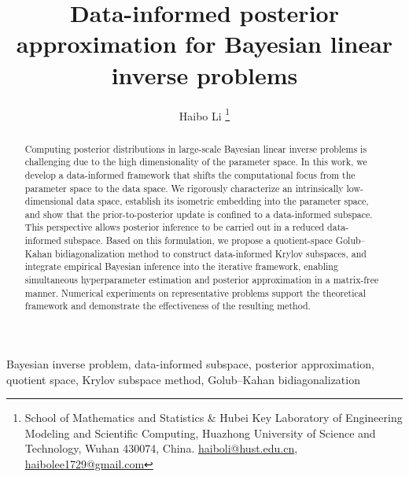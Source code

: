 \documentclass[]{myarticle}
\date{}
\title{Data-informed posterior approximation for Bayesian linear inverse problems}
\author{
Haibo Li 
\thanks{School of Mathematics and Statistics \& Hubei Key Laboratory of Engineering Modeling and Scientific Computing, Huazhong University of Science and Technology, Wuhan 430074, China.
\href{mailto:haiboli@hust.edu.cn}{haiboli@hust.edu.cn}, \href{mailto:haibolee1729@gmail.com}{haibolee1729@gmail.com}}
}
\begin{document}
\maketitle

\begin{abstract}
  Computing posterior distributions in large-scale Bayesian linear inverse problems is challenging due to the high dimensionality of the parameter space. In this work, we develop a data-informed framework that shifts the computational focus from the parameter space to the data space. We rigorously characterize an intrinsically low-dimensional data space, establish its isometric embedding into the parameter space, and show that the prior-to-posterior update is confined to a data-informed subspace. This perspective allows posterior inference to be carried out in a reduced data-informed subspace. Based on this formulation, we propose a quotient-space Golub--Kahan bidiagonalization method to construct data-informed Krylov subspaces, and integrate empirical Bayesian inference into the iterative framework, enabling simultaneous hyperparameter estimation and posterior approximation in a matrix-free manner. Numerical experiments on representative problems support the theoretical framework and demonstrate the effectiveness of the resulting method.
\end{abstract}

\begin{keywords}
  Bayesian inverse problem, data-informed subspace, posterior approximation, quotient space, Krylov subspace method, Golub--Kahan bidiagonalization
\end{keywords}

\tableofcontents


\end{document}
